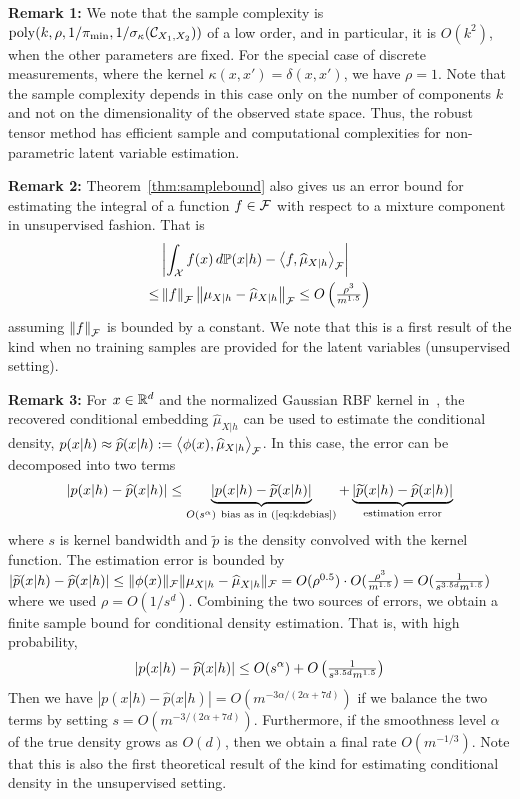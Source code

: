 \documentclass{article}
\begin{document}
{\bf Remark 1:} We note that the sample complexity is  $\operatorname{poly}(k, \rho, 1/\pi_{\min}, 1/\sigma_\kappa(\mathcal{C}_{X_1, X_2}))$ of a low order, and in particular,  it is $O(k^2)$, when the other parameters are fixed. For the special case of discrete measurements, where the kernel $\kappa(x,x')=\delta(x,x')$, we have $\rho=1$. Note that the sample complexity depends in this case only on the number of components $k$ and not on the dimensionality of the observed state space.   Thus, the robust tensor method has efficient sample and computational complexities for non-parametric latent variable estimation.

{\bf Remark 2:} Theorem~\ref{thm:samplebound} also gives us an error bound for estimating the integral of a function $f\in \mathcal{F}$ with respect to a mixture component in unsupervised fashion. That is
\begin{align*}
	&\left|\int_{\mathcal{X}} f(x)\, d\mathbb{P}(x|h) - \left\langle f,\widehat \mu_{X|h} \right\rangle_{\mathcal{F}}\right| \\
	\leq& \left\|f\right\|_{\mathcal{F}} \left\|\mu_{X|h} - \widehat \mu_{X|h}\right\|_{\mathcal{F}}
	\leq O\left({\textstyle \frac{\rho^3}{m^{1.5}}}\right)
\end{align*}
assuming $\left\|f\right\|_{\mathcal{F}}$ is bounded by a constant. We note that this is a first result of the kind when no training samples are provided for the latent variables (unsupervised setting).

{\bf Remark 3:} For $x\in \mathbb{R}^d$ and the normalized Gaussian RBF kernel in~, the recovered conditional embedding $\widehat \mu_{X|h}$ can be used to estimate the conditional density, $p(x|h) \approx \widehat p(x|h) := \left\langle \phi(x),\widehat \mu_{X|h} \right\rangle_{\mathcal{F}}$. In this case, the error can be decomposed into two terms
\begin{align*}
  \abr{p(x|h) - \widehat p(x|h)}
  \leq \underbrace{\abr{p(x|h) - \widetilde p(x|h)}}_{O(s^\alpha)~\text{bias as in~\eq{eq:kdebias}}} + \underbrace{\abr{\widetilde p(x|h) - \widehat p(x|h)}}_{\text{estimation error}}
\end{align*}
where $s$ is kernel bandwidth and $\widetilde p$ is the density convolved with the kernel function. The estimation error is bounded by
$|\widetilde p(x|h) - \widehat p(x|h)|
  \leq \|\phi(x)\|_{\mathcal{F}} \|\mu_{X|h} - \widehat \mu_{X|h}\|_{\mathcal{F}}
  =O(\rho^{0.5})\cdot O({\textstyle \frac{\rho^3}{m^{1.5}}}) = O({\textstyle \frac{1}{s^{3.5d}m^{1.5}}})
$
where we used $\rho = O(1/s^d)$.
Combining the two sources of errors, we obtain a finite sample bound for conditional density estimation. That is, with high probability,
\begin{align*}
  |p(x|h) - \widehat p(x|h)|
  \leq O(s^\alpha) + O\left({\textstyle \frac{1}{s^{3.5d}m^{1.5}}}\right)
\end{align*}
Then we have $|p(x|h) - \widehat p(x|h)| = O(m^{-3\alpha/(2\alpha+7d)})$ if we balance the two terms by setting $s = O(m^{-3/(2\alpha+7d)})$.
Furthermore, if the smoothness level $\alpha$ of the true density grows as $O(d)$, then we obtain a final rate $O(m^{-1/3})$.
Note that this is also the first theoretical result of the kind for estimating conditional density in the unsupervised setting.
\end{document}
